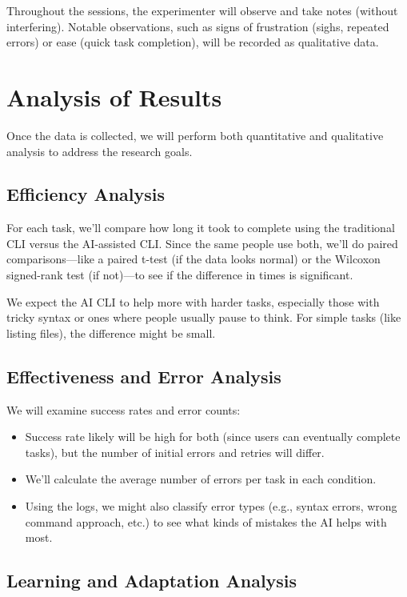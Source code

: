 Throughout the sessions, the experimenter will observe and take notes (without interfering). Notable observations, such as signs of frustration (sighs, repeated errors) or ease (quick task completion), will be recorded as qualitative data.

\section{Analysis of Results}

Once the data is collected, we will perform both quantitative and qualitative analysis to address the research goals.

\subsection{Efficiency Analysis}

For each task, we'll compare how long it took to complete using the traditional CLI versus the AI-assisted CLI. Since the same people use both, we'll do paired comparisons—like a paired t-test (if the data looks normal) or the Wilcoxon signed-rank test (if not)—to see if the difference in times is significant.

We expect the AI CLI to help more with harder tasks, especially those with tricky syntax or ones where people usually pause to think. For simple tasks (like listing files), the difference might be small.

\subsection{Effectiveness and Error Analysis}

We will examine success rates and error counts:
\begin{itemize}
	\item Success rate likely will be high for both (since users can eventually complete tasks), but the number of initial errors and retries will differ.
	\item We'll calculate the average number of errors per task in each condition.
	\item Using the logs, we might also classify error types (e.g., syntax errors, wrong command approach, etc.) to see what kinds of mistakes the AI helps with most.
\end{itemize}

\subsection{Learning and Adaptation Analysis}

